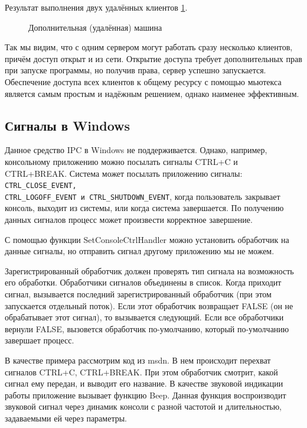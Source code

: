 \documentclass[a4paper]{article}
\begin{document}
	Результат выполнения двух удалённых клиентов \ref{img:task6_3}.
	\begin{figure}[h!]
		\caption{Дополнительная (удалённая) машина}
		\label{img:task6_3}
	\end{figure}
	
Так мы видим, что с одним сервером могут работать сразу несколько клиентов, причём доступ открыт и из сети. Открытие доступа требует дополнительных прав при запуске программы, но получив права, сервер успешно запускается. Обеспечение доступа всех клиентов к общему ресурсу с помощью мьютекса является самым простым и надёжным решением, однако наименее эффективным.
	
\subsection{Сигналы в Windows}
	Данное средство IPC в Windows не поддерживается. Однако, например, консольному приложению можно посылать сигналы CTRL+C и CTRL+BREAK. Система может посылать приложению сигналы: \texttt{CTRL\_CLOSE\_EVENT,\\ CTRL\_LOGOFF\_EVENT и CTRL\_SHUTDOWN\_EVENT}, когда пользователь закрывает консоль, выходит из системы, или когда система завершается. По получению данных сигналов процесс может произвести корректное завершение.
	
	С помощью функции SetConsoleCtrlHandler можно установить обработчик на данные сигналы, но отправить сигнал другому приложению мы не можем. 
	
	Зарегистрированный обработчик должен проверять тип сигнала на возможность его обработки. Обработчики сигналов объединены в список. Когда приходит сигнал, вызывается последний зарегистрированный обработчик (при этом запускается отдельный поток). Если этот обработчик возвращает FALSE (он не обрабатывает этот сигнал), то вызывается следующий. Если все обработчики вернули FALSE, вызовется обработчик по-умолчанию, который по-умолчанию завершает процесс.
	
	В качестве примера рассмотрим код из msdn. В нем происходит перехват сигналов CTRL+C, CTRL+BREAK. При этом обработчик смотрит, какой сигнал ему передан, и выводит его название. В качестве звуковой индикации работы приложение вызывает функцию Beep. Данная функция воспроизводит звуковой сигнал через динамик консоли с разной частотой и длительностью, задаваемыми ей через параметры.
	
\end{document}
